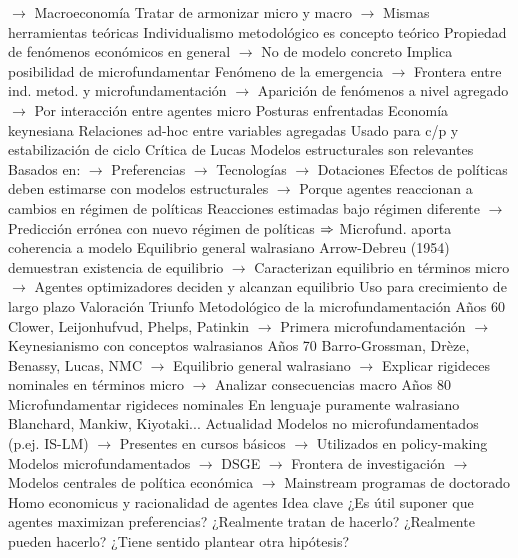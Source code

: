 \documentclass{nuevotema}
\begin{document}
\begin{esquemal}
				\4[] $\to$ Macroeconomía
				\4[] Tratar de armonizar micro y macro
				\4[] $\to$ Mismas herramientas teóricas
				\4 Individualismo metodológico es concepto teórico
				\4[] Propiedad de fenómenos económicos en general
				\4[] $\to$ No de modelo concreto
				\4[] Implica posibilidad de microfundamentar
				\4[] Fenómeno de la emergencia
				\4[] $\to$ Frontera entre ind. metod. y microfundamentación
				\4[] $\to$ Aparición de fenómenos a nivel agregado
				\4[] $\to$ Por interacción entre agentes micro
			\3 Posturas enfrentadas
				\4 Economía keynesiana
				\4[] Relaciones ad-hoc entre variables agregadas
				\4[] Usado para c/p y estabilización de ciclo
				\4 Crítica de Lucas
				\4[] Modelos estructurales son relevantes
				\4[] Basados en:
				\4[] $\to$ Preferencias
				\4[] $\to$ Tecnologías
				\4[] $\to$ Dotaciones
				\4[] Efectos de políticas deben estimarse con modelos estructurales
				\4[] $\to$ Porque agentes reaccionan a cambios en régimen de políticas
				\4[] Reacciones estimadas bajo régimen diferente
				\4[] $\to$ Predicción errónea con nuevo régimen de políticas
				\4[] $\Rightarrow$ Microfund. aporta coherencia a modelo
				\4 Equilibrio general walrasiano
				\4[] Arrow-Debreu (1954) demuestran existencia de equilibrio
				\4[] $\to$ Caracterizan equilibrio en términos micro
				\4[] $\to$ Agentes optimizadores deciden y alcanzan equilibrio
				\4[] Uso para crecimiento de largo plazo
			\3 Valoración
				\4 Triunfo Metodológico de la microfundamentación
				\4 Años 60
				\4[] Clower, Leijonhufvud, Phelps, Patinkin
				\4[] $\to$ Primera microfundamentación
				\4[] $\to$ Keynesianismo con conceptos walrasianos
				\4 Años 70
				\4[] Barro-Grossman, Drèze, Benassy, Lucas, NMC
				\4[] $\to$ Equilibrio general walrasiano
				\4[] $\to$ Explicar rigideces nominales en términos micro
				\4[] $\to$ Analizar consecuencias macro
				\4 Años 80
				\4[] Microfundamentar rigideces nominales
				\4[] En lenguaje puramente walrasiano
				\4[] Blanchard, Mankiw, Kiyotaki...
				\4 Actualidad
				\4[] Modelos no microfundamentados (p.ej. IS-LM)
				\4[] $\to$ Presentes en cursos básicos
				\4[] $\to$ Utilizados en policy-making
				\4[] Modelos microfundamentados
				\4[] $\to$ DSGE
				\4[] $\to$ Frontera de investigación
				\4[] $\to$ Modelos centrales de política económica
				\4[] $\to$ Mainstream programas de doctorado
		\2 Homo economicus y racionalidad de agentes
			\3 Idea clave
				\4 ¿Es útil suponer que agentes maximizan preferencias?
				\4[] ¿Realmente tratan de hacerlo?
				\4[] ¿Realmente pueden hacerlo?
				\4[] ¿Tiene sentido plantear otra hipótesis?

\end{esquemal}
\end{document}
